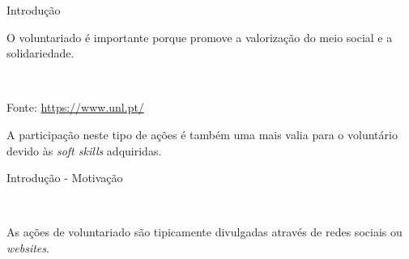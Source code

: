 \begin{frame}{Introdução}

\vspace*{-3em}

O voluntariado é importante porque promove a valorização do meio social e a solidariedade.

\\

\vspace*{-1em}
\begin{center}
	Fonte: \url{https://www.unl.pt/}
\end{center}
\vspace*{-1em}

A participação neste tipo de ações é também uma mais valia para o voluntário devido às \textit{soft skills} adquiridas.

\end{frame}


\begin{frame}{Introdução - Motivação}

\vspace*{-2em}
\\

\vspace*{2em}

{\normalsize As ações de voluntariado são tipicamente divulgadas através de redes sociais ou \textit{websites}. }

\end{frame}

